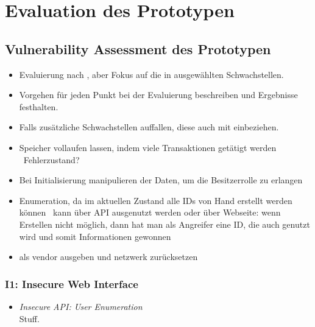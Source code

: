 \section{Evaluation des Prototypen}
\label{sec:evaluation}

    \subsection{Vulnerability Assessment des Prototypen}

        \begin{itemize}[noitemsep]
            \item Evaluierung nach \cite{Miessler}, aber Fokus auf die in  ausgewählten Schwachstellen. 
            \item Vorgehen für jeden Punkt bei der Evaluierung beschreiben und Ergebnisse festhalten. 
            \item Falls zusätzliche Schwachstellen auffallen, diese auch mit einbeziehen.
        \end{itemize}
        
        \begin{itemize}[noitemsep]
            \item Speicher vollaufen lassen, indem viele Transaktionen getätigt werden \textrightarrow\ Fehlerzustand?
            \item Bei Initialisierung manipulieren der Daten, um die Besitzerrolle zu erlangen
            \item Enumeration, da im aktuellen Zustand alle IDs von Hand erstellt werden können \textrightarrow\ kann über API ausgenutzt werden oder über Webseite: wenn Erstellen nicht möglich, dann hat man als Angreifer eine ID, die auch genutzt wird und somit Informationen gewonnen
            \item als vendor ausgeben und netzwerk zurücksetzen
        \end{itemize}
    
        \subsubsection*{I1: Insecure Web Interface}
           \begin{itemize}[leftmargin=0cm,label={}]
                \item \emph{Insecure API: User Enumeration}\label{vuln:prototype_userenum}\\
                    Stuff.
           \end{itemize} 
           
